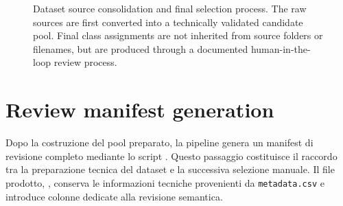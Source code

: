 \begin{figure}[H]
{%
}
\caption[Dataset source consolidation and final selection process]{Dataset source consolidation and final selection process. The raw sources are first converted into a technically validated candidate pool. Final class assignments are not inherited from source folders or filenames, but are produced through a documented human-in-the-loop review process.}
\label{fig:methodology-dataset-source-consolidation}
\end{figure}


\section{Review manifest generation}
\label{sec:methodology-review-manifest}

Dopo la costruzione del pool preparato, la pipeline genera un manifest di
revisione completo mediante lo script
.
Questo passaggio costituisce il raccordo tra la preparazione tecnica del dataset
e la successiva selezione manuale. Il file prodotto,
, conserva le
informazioni tecniche provenienti da \texttt{metadata.csv} e introduce colonne
dedicate alla revisione semantica.


